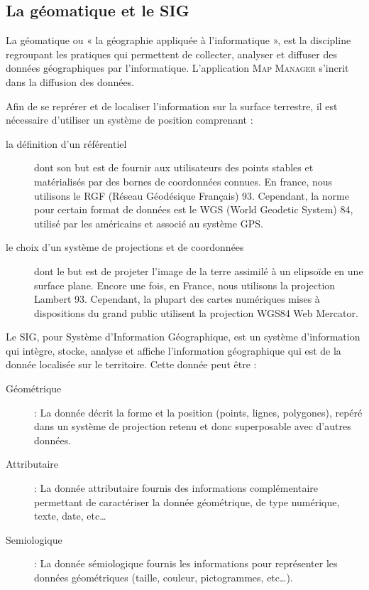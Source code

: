 \documentclass{rapportUHA40}
\begin{document}
\subsection{La géomatique et le SIG}
La géomatique ou « la géographie appliquée à l'informatique », est la
discipline regroupant les pratiques qui permettent de collecter, analyser et
diffuser des données géographiques par l'informatique. L'application
\textsc{Map Manager} s'incrit dans la diffusion des données.

Afin de se reprérer et de localiser l'information sur la surface terrestre, il
est nécessaire d'utiliser un système de position comprenant :
\begin{description}
  \item[la définition d'un référentiel] dont son but est de fournir aux utilisateurs
    des points stables et matérialisés par des bornes de coordonnées connues. En
    france, nous utilisons le RGF (Réseau Géodésique Français) 93. Cependant, la
    norme pour certain format de données est le WGS (World Geodetic System) 84,
    utilisé par les américains et associé au système GPS\@.
  \item[le choix d'un système de projections et de coordonnées] dont le but est de
    projeter l'image de la terre assimilé à un elipsoïde en une surface plane.
    Encore une fois, en France, nous utilisons la projection Lambert 93. Cependant,
    la plupart des cartes numériques mises à dispositions du grand public utilisent
    la projection WGS84 Web Mercator.
\end{description}

Le SIG, pour Système d'Information Géographique, est un système d’information
qui intègre, stocke, analyse et affiche l'information géographique qui est de
la donnée localisée sur le territoire. Cette donnée peut être :
\begin{description}
  \item[Géométrique] : La donnée décrit la forme et la position (points, lignes,
    polygones), repéré dans un système de projection retenu et donc superposable
    avec d'autres données.
  \item[Attributaire] : La donnée attributaire fournis des informations complémentaire
    permettant de caractériser la donnée géométrique, de type numérique, texte,
    date, etc\ldots
  \item[Semiologique] : La donnée sémiologique fournis les informations pour
    représenter les données géométriques (taille, couleur, pictogrammes,
    etc\ldots).
\end{description}
\end{document}
